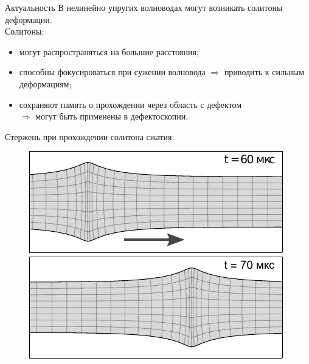 \documentclass[usenames,dvipsnames]{beamer}
\begin{document}
\begin{frame}{Актуальность}
	В нелинейно упругих волноводах могут возникать солитоны деформации.\\
	\vspace{2mm}
	Солитоны:
	\begin{itemize}
		\item могут распространяться на большие расстояния;
		\item способны фокусироваться при сужении волновода $\Rightarrow$ приводить к сильным деформациям;
		\item сохраняют память о прохождении через область с дефектом\\ $\Rightarrow$ могут быть применены в дефектоскопии.
	\end{itemize}
	\vspace{2mm}
	Стержень при прохождении солитона сжатия:
	\begin{figure}
		\vspace{-2mm}
		\includegraphics[width=0.46\linewidth]{figures/DeformedRod1}
		\hspace{5mm}
		\includegraphics[width=0.46\linewidth]{figures/DeformedRod2}
	\end{figure}
\end{frame}
\end{document}
